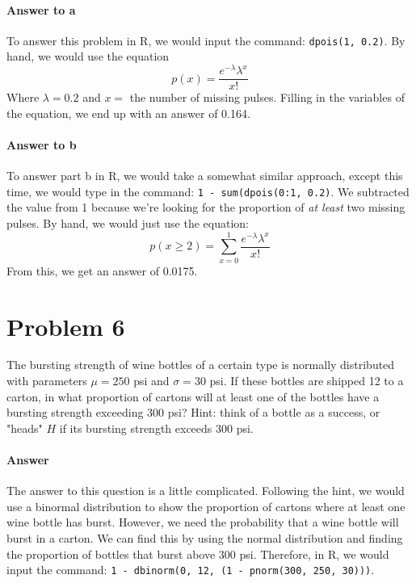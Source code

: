 \documentclass{article}
\newcommand{\code}[1]{\texttt{#1}}
\begin{document}
	\paragraph{Answer to a} To answer this problem in R, we would input the command: 
	\code{dpois(1, 0.2)}. By hand, we would use the equation
	\begin{displaymath}
		p(x) = \frac{e^{-\lambda}\lambda^x}{x!}
	\end{displaymath}
	Where $\lambda = 0.2$ and $x =$ the number of missing pulses. Filling in the variables of the equation, we end up with an answer of 0.164. %
	
	\paragraph{Answer to b} To answer part b in R, we would take a somewhat similar approach, except this time, we would type in the command: \code{1 - sum(dpois(0:1, 0.2)}. We subtracted the value from 1 because we're looking for the proportion of \emph{at least} two missing pulses. By hand, we would just use the equation:
	\begin{displaymath}
		p(x \ge 2) = \sum_{x=0}^{1} \frac{e^{-\lambda}\lambda^x}{x!}
	\end{displaymath}
	From this, we get an answer of 0.0175. %

\section*{Problem 6}

	The bursting strength of wine bottles of a certain type is normally distributed with parameters $
	\mu = 250$ psi and $\sigma = 30$ psi. If these bottles are shipped 12 to a carton, in what 
	proportion of cartons will at least one of the bottles have a bursting strength exceeding 300 psi? 
	Hint: think of a bottle as a success, or "heads" $H$ if its bursting strength exceeds 300 psi.

	\paragraph{Answer} The answer to this question is a little complicated. Following the hint, we 
	would use a binormal distribution to show the proportion of cartons where at least one wine 
	bottle has burst. However, we need the probability that a wine bottle will burst in a carton. We 
	can find this by using the normal distribution and finding the proportion of bottles that burst 
	above 300 psi. Therefore, in R, we would input the command: \code{1 - dbinorm(0, 12, (1 - 
	pnorm(300, 250, 30)))}. \\
	
\end{document}
